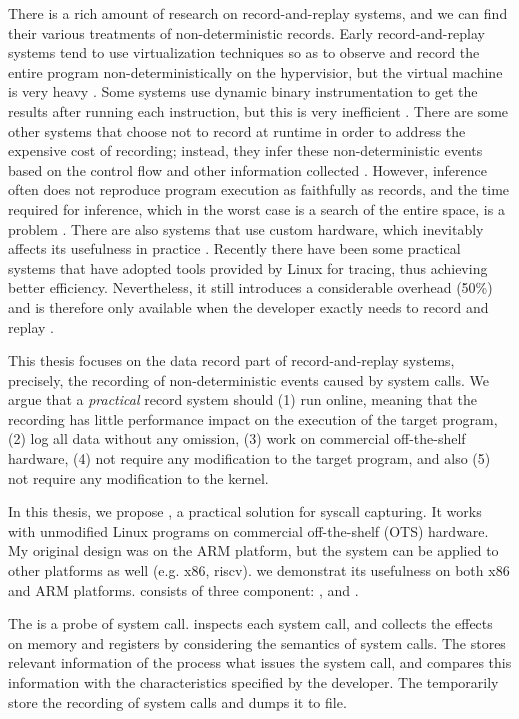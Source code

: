 There is a rich amount of research on record-and-replay systems, and we can find
their various treatments of non-deterministic records. Early record-and-replay
systems tend to use virtualization techniques so as to observe and record the
entire program non-deterministically on the hypervisior, but the virtual machine
is very heavy \cite{dunlap_revirt_2003, dunlap_smp-revirt_2008}. Some systems
use dynamic binary instrumentation to get the results after running each
instruction, but this is very inefficient \cite{bhansali_framework_2006}. There
are some other systems that choose not to record at runtime in order to address
the expensive cost of recording; instead, they infer these non-deterministic
events based on the control flow and other information collected
\cite{altekar_odr_2009,cui_rept_2018}. However, inference often does not
reproduce program execution as faithfully as records, and the time required for
inference, which in the worst case is a search of the entire space, is a problem
\cite{replay_survey}. There are also systems that use custom hardware, which
inevitably affects its usefulness in practice \cite{montesinos_capo_2009}.
Recently there have been some practical systems that have adopted tools provided
by Linux for tracing, thus achieving better efficiency. Nevertheless, it still
introduces a considerable overhead (50\%) and is therefore only available
when the developer exactly needs to record and replay \cite{203227}.

This thesis focuses on the data record part of record-and-replay systems, precisely, the recording of non-deterministic events caused by system calls. We argue that a \textit{practical} record system should  (1) run online, meaning that the recording has little performance impact on the execution of the target program, (2) log all data without any omission, (3) work on commercial off-the-shelf hardware, (4) not require any modification to the target program, and also (5) not require any modification to the kernel.

In this thesis, we propose \TheName, a practical solution for syscall capturing. 
It works with unmodified Linux programs on commercial off-the-shelf (OTS) hardware. My original design was on the ARM platform, but the system can be applied to other platforms as well (e.g. x86, riscv). we demonstrat its usefulness on both x86 and ARM platforms. \TheName consists of three component: \CoreHook, \Filter and \RecordBuffer.

The \CoreHook is a probe of system call. \CoreHook inspects each system call,   and collects the effects on memory and registers by considering the semantics of system calls. The \Filter stores relevant information of the process what issues the system call, and compares this information with the characteristics specified by the developer. The \RecordBuffer temporarily store the recording of system calls and dumps it to file.

